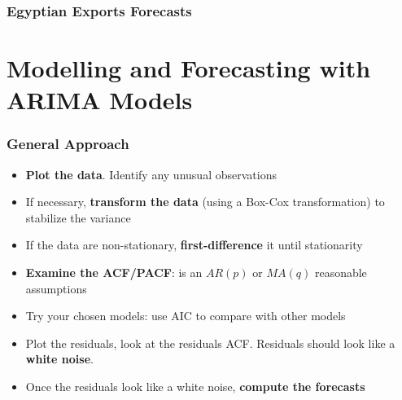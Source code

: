 \documentclass{beamer}
\begin{document}
\begin{frame}
  \frametitle{Egyptian Exports Forecasts}
\end{frame}


\section{Modelling and Forecasting with ARIMA Models}


\begin{frame}
  \frametitle{General Approach}
  \begin{itemize}
  \item \textbf{Plot the data}. Identify any unusual observations
  \item If necessary, \textbf{transform the data} (using a Box-Cox transformation) to stabilize the variance
  \item If the data are non-stationary, \textbf{first-difference} it until stationarity
  \item \textbf{Examine the ACF/PACF}: is an $AR(p)$ or $MA(q)$ reasonable assumptions
  \item Try your chosen models: use AIC to compare with other models
  \item Plot the residuals, look at the residuals ACF. Residuals should look like a \textbf{white noise}.
  \item Once the residuals look like a white noise, \textbf{compute the forecasts}    
  \end{itemize}
\end{frame}
\end{document}
